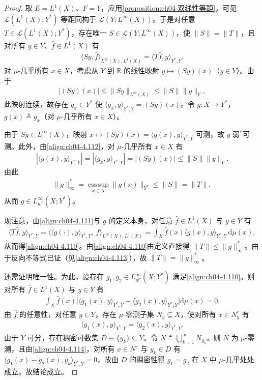 \documentclass[../../main.tex]{subfiles}%
\begin{document}
\begin{proof}
取 $E=L^1(X)$、$F=Y$，应用\cref{proposition:ch04-双线性等距}，可见 $\mathcal{L}(L^1(X);Y^*)$ 等距同构于 $\mathcal{L}(Y;L^\infty(X))$。于是对任意 $T\in\mathcal{L}(L^1(X);Y^*)$，存在唯一 $S\in\mathcal{L}(Y;L^\infty(X))$，使 $\|S\|=\|T\|$，且对所有 $y\in Y$、$\hat f\in L^1(X)$ 有
\begin{align}
\langle Sy,\hat f\rangle_{L^\infty(X),L^1(X)}=\langle T\hat f,y\rangle_{Y^*,Y}. \label{align:ch04-4.111}
\end{align}
对 $\mu$-几乎所有 $x\in X$，考虑从 $Y$ 到 $\mathbb{R}$ 的线性映射 $y\mapsto(Sy)(x)$（$y\in Y$）。由于
\begin{align}
|(Sy)(x)|\leqslant\|Sy\|_{L^\infty(X)}\leqslant\|S\|\|y\|_Y, \label{align:ch04-4.112}
\end{align}
此映射连续，故存在 $g_x\in Y^*$ 使 $\langle g_x,y\rangle_{Y^*,Y}=(Sy)(x)$。令 $g:X\to Y^*$，$g(x)\triangleq g_x$（对 $\mu$-几乎所有 $x\in X$）。

由于 $Sy\in L^\infty(X)$，映射 $x\mapsto(Sy)(x)=\langle g(x),y\rangle_{Y^*,Y}$ 可测，故 $g$ 弱$^*$可测。此外，由\eqref{align:ch04-4.112}，对 $\mu$-几乎所有 $x\in X$ 有
\begin{align*}
|\langle g(x),y\rangle_{Y^*,Y}|=|\langle g_x,y\rangle_{Y^*,Y}|=|(Sy)(x)|\leqslant\|S\|\|y\|_Y.
\end{align*}
由此
\begin{align}
\|g\|_\infty^*=\operatorname*{ess\,sup}_{x\in X}\|g(x)\|_{Y^*}\leqslant\|S\|=\|T\|, \label{align:ch04-4.113}
\end{align}
从而 $g\in L^\infty_{w^*}(X;Y^*)$。

现注意，由\eqref{align:ch04-4.111}与 $g$ 的定义本身，对任意 $\hat f\in L^1(X)$ 与 $y\in Y$ 有
\begin{align*}
\langle T\hat f,y\rangle_{Y^*,Y}=\big\langle\langle g(\cdot),y\rangle_{Y^*,Y},\,\hat f\big\rangle_{L^\infty(X),L^1(X)}
=\int_X\hat f(x)\langle g(x),y\rangle_{Y^*,Y}\,\mathrm{d}\mu(x),
\end{align*}
从而得\eqref{align:ch04-4.110}。由\eqref{align:ch04-4.110}由定义直接得 $\|T\|\leqslant\|g\|_\infty^*$。由于反向不等式已证（见\eqref{align:ch04-4.113}），故 $\|T\|=\|g\|_\infty^*$。

还需证明唯一性。为此，设存在 $g_1,g_2\in L^\infty_{w^*}(X;Y^*)$ 满足\eqref{align:ch04-4.110}。则对所有 $\hat f\in L^1(X)$ 与 $y\in Y$ 有
\begin{align*}
\int_X\hat f(x)\big[\langle g_1(x),y\rangle_{Y^*,Y}-\langle g_2(x),y\rangle_{Y^*,Y}\big]\mathrm{d}\mu(x)=0.
\end{align*}
由 $\hat f$ 的任意性，对任意 $y\in Y$，存在 $\mu$-零测子集 $N_y\subseteq X$，使对所有 $x\in N_y^c$ 有
\begin{align}
\langle g_1(x),y\rangle_{Y^*,Y}=\langle g_2(x),y\rangle_{Y^*,Y}. \label{align:ch04-4.114}
\end{align}
由于 $Y$ 可分，存在稠密可数集 $D\equiv\{y_k\}\subseteq Y$。令 $N\triangleq\bigcup_{k=1}^\infty N_{y_k}$。则 $N$ 为 $\mu$-零测，且由\eqref{align:ch04-4.114}，对所有 $x\in N^c$ 与 $y_k\in D$ 有 $\langle g_1(x)-g_2(x),y_k\rangle_{Y^*,Y}=0$，故由 $D$ 的稠密性得 $g_1=g_2$ 在 $X$ 中 $\mu$-几乎处处成立。故结论成立。
\end{proof}
\end{document}
